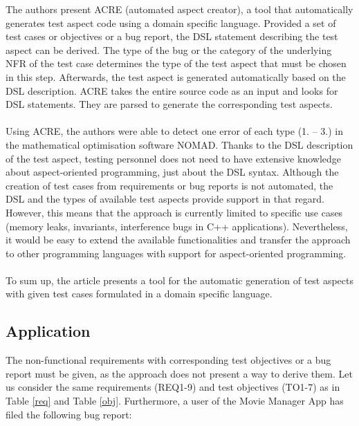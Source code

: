 The authors present ACRE (automated aspect creator), a tool that automatically generates test aspect code using a domain specific language. Provided a set of test cases or objectives or a bug report, the DSL statement describing the test aspect can be derived. The type of the bug or the category of the underlying NFR of the test case determines the type of the test aspect that must be chosen in this step. Afterwards, the test aspect is generated automatically based on the DSL description. ACRE takes the entire source code as an input and looks for DSL statements. They are parsed to generate the corresponding test aspects.\\
\\
Using ACRE, the authors were able to detect one error of each type (1. – 3.) in the mathematical optimisation software NOMAD. Thanks to the DSL description of the test aspect, testing personnel does not need to have extensive knowledge about aspect-oriented programming, just about the DSL syntax. Although the creation of test cases from requirements or bug reports is not automated, the DSL and the types of available test aspects provide support in that regard. However, this means that the approach is currently limited to specific use cases (memory leaks, invariants, interference bugs in C++ applications). Nevertheless, it would be easy to extend the available functionalities and transfer the approach to other programming languages with support for aspect-oriented programming. \\
\\
To sum up, the article presents a tool for the automatic generation of test aspects with given test cases formulated in a domain specific language.

\newpage
\subsection{Application}
The non-functional requirements with corresponding test objectives or a bug report must be given, as the approach does not present a way to derive them. Let us consider the same requirements (REQ1-9) and test objectives (TO1-7) as in Table \ref{req} and Table \ref{obj}. Furthermore, a user of the Movie Manager App has filed the following bug report:

